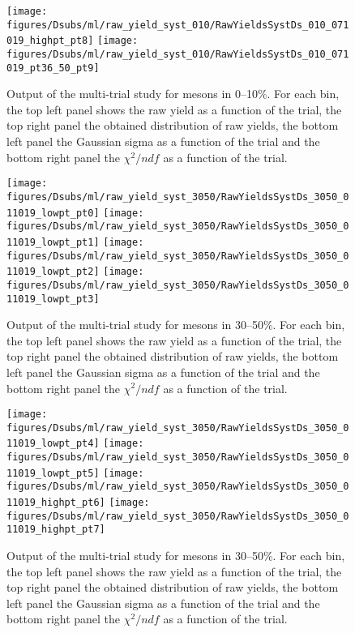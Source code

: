 \begin{figure}[htbp]
  \begin{center}
  \texttt{[image: figures/Dsubs/ml/raw\_yield\_syst\_010/RawYieldsSystDs\_010\_071019\_highpt\_pt8]}
  \texttt{[image: figures/Dsubs/ml/raw\_yield\_syst\_010/RawYieldsSystDs\_010\_071019\_pt36\_50\_pt9]}
  \caption{Output of the multi-trial study for \Dsubs mesons in 0--10$\%$. For each \pt bin, the top left panel shows the raw yield 
           as a function of the trial, the top right panel the obtained distribution of raw yields, the bottom left panel the Gaussian 
           sigma as a function of the trial and the bottom right panel the $\chi^2/ndf$ as a function of the trial.}
  \label{fig:DsYieldSyst010_ml_3}
  \end{center}
\end{figure}
\begin{figure}[htbp]
  \begin{center}
  \texttt{[image: figures/Dsubs/ml/raw\_yield\_syst\_3050/RawYieldsSystDs\_3050\_011019\_lowpt\_pt0]}
  \texttt{[image: figures/Dsubs/ml/raw\_yield\_syst\_3050/RawYieldsSystDs\_3050\_011019\_lowpt\_pt1]}
  \texttt{[image: figures/Dsubs/ml/raw\_yield\_syst\_3050/RawYieldsSystDs\_3050\_011019\_lowpt\_pt2]}
  \texttt{[image: figures/Dsubs/ml/raw\_yield\_syst\_3050/RawYieldsSystDs\_3050\_011019\_lowpt\_pt3]}
  \caption{Output of the multi-trial study for \Dsubs mesons in 30--50\%. For each \pt bin, the top left panel shows the raw yield 
           as a function of the trial, the top right panel the obtained distribution of raw yields, the bottom left panel the Gaussian 
           sigma as a function of the trial and the bottom right panel the $\chi^2/ndf$ as a function of the trial.}
  \label{fig:DsYieldSyst3050_ml_1}
  \end{center}
\end{figure}
\begin{figure}[htbp]
  \begin{center}
  \texttt{[image: figures/Dsubs/ml/raw\_yield\_syst\_3050/RawYieldsSystDs\_3050\_011019\_lowpt\_pt4]}
  \texttt{[image: figures/Dsubs/ml/raw\_yield\_syst\_3050/RawYieldsSystDs\_3050\_011019\_lowpt\_pt5]}
  \texttt{[image: figures/Dsubs/ml/raw\_yield\_syst\_3050/RawYieldsSystDs\_3050\_011019\_highpt\_pt6]}
  \texttt{[image: figures/Dsubs/ml/raw\_yield\_syst\_3050/RawYieldsSystDs\_3050\_011019\_highpt\_pt7]}
  \caption{Output of the multi-trial study for \Dsubs mesons in 30--50\%. For each \pt bin, the top left panel shows the raw yield 
           as a function of the trial, the top right panel the obtained distribution of raw yields, the bottom left panel the Gaussian 
           sigma as a function of the trial and the bottom right panel the $\chi^2/ndf$ as a function of the trial.}
  \label{fig:DsYieldSyst3050_ml_2}
  \end{center}
\end{figure}
